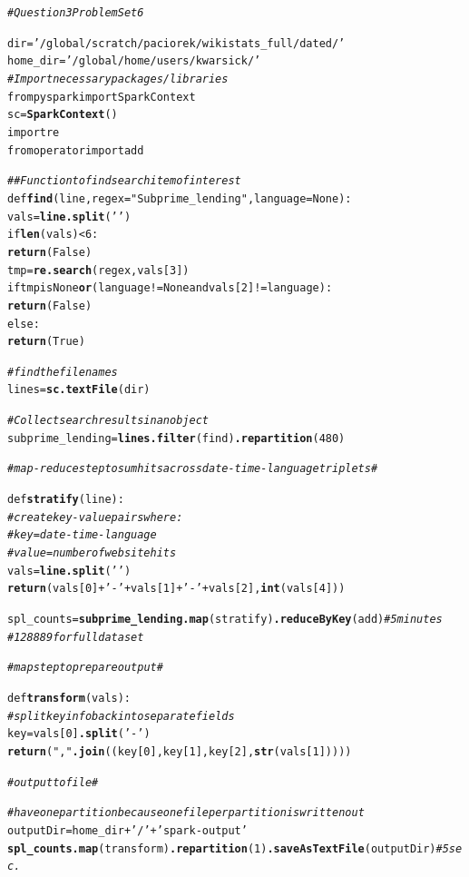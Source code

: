 \documentclass{article}\usepackage[]{graphicx}\usepackage[]{color}
\makeatletter
\newcommand{\hlstr}[1]{\textcolor[rgb]{0.192,0.494,0.8}{#1}}%
\newcommand{\hlcom}[1]{\textcolor[rgb]{0.678,0.584,0.686}{\textit{#1}}}%
\newcommand{\hlkwd}[1]{\textcolor[rgb]{0.737,0.353,0.396}{\textbf{#1}}}%
\newenvironment{kframe}{%
 \def\at@end@of@kframe{}%
 \ifinner\ifhmode%
  \def\at@end@of@kframe{\end{minipage}}%
  \begin{minipage}{\columnwidth}%
 \fi\fi%
 \def\FrameCommand##1{\hskip\@totalleftmargin \hskip-\fboxsep
 \colorbox{shadecolor}{##1}\hskip-\fboxsep
     \hskip-\linewidth \hskip-\@totalleftmargin \hskip\columnwidth}%
 \MakeFramed {\advance\hsize-\width
   \@totalleftmargin\z@ \linewidth\hsize
   \@setminipage}}%
 {\par\unskip\endMakeFramed%
 \at@end@of@kframe}
\newenvironment{knitrout}{}{} %
\makeatother
\begin{document}
\begin{knitrout}
\color{fgcolor}\begin{kframe}
\begin{alltt}
\hlcom{#Question 3 Problem Set 6}

dir      = \hlstr{'/global/scratch/paciorek/wikistats_full/dated/'}
home_dir = \hlstr{'/global/home/users/kwarsick/'}
\hlcom{#Import necessary packages/libraries}
from pyspark import SparkContext
sc = \hlkwd{SparkContext}()
import re
from operator import add

\hlcom{##Function to find search item of interest}
def \hlkwd{find}(line, regex = \hlstr{"Subprime_lending"}, language = None):
    vals = \hlkwd{line.split}(\hlstr{' '})
    if \hlkwd{len}(vals) < 6:
        \hlkwd{return}(False)
    tmp = \hlkwd{re.search}(regex, vals[3])
    if tmp is None \hlkwd{or} (language != None and vals[2] != language):
        \hlkwd{return}(False)
    else:
        \hlkwd{return}(True)

\hlcom{# find the file names}
lines = \hlkwd{sc.textFile}(dir) 		


\hlcom{#Collect search results in an object}
subprime_lending = \hlkwd{lines.filter}(find)\hlkwd{.repartition}(480)

\hlcom{# map-reduce step to sum hits across date-time-language triplets #}
    
def \hlkwd{stratify}(line):
\hlcom{    # create key-value pairs where:}
\hlcom{    #   key = date-time-language}
\hlcom{    #   value = number of website hits}
    vals = \hlkwd{line.split}(\hlstr{' '})
    \hlkwd{return}(vals[0] + \hlstr{'-'} + vals[1] + \hlstr{'-'} + vals[2], \hlkwd{int}(vals[4]))
	
	
spl_counts = \hlkwd{subprime_lending.map}(stratify)\hlkwd{.reduceByKey}(add)  \hlcom{# 5 minutes}
\hlcom{# 128889 for full dataset}

\hlcom{# map step to prepare output #}

def \hlkwd{transform}(vals):
\hlcom{    # split key info back into separate fields}
    key = vals[0]\hlkwd{.split}(\hlstr{'-'})
    \hlkwd{return}(\hlstr{","}\hlkwd{.join}((key[0], key[1], key[2], \hlkwd{str}(vals[1]))))

\hlcom{# output to file #}

\hlcom{# have one partition because one file per partition is written out}
outputDir = home_dir + \hlstr{'/'} + \hlstr{'spark-output'}
\hlkwd{spl_counts.map}(transform)\hlkwd{.repartition}(1)\hlkwd{.saveAsTextFile}(outputDir) \hlcom{# 5 sec.}
\end{alltt}
\end{kframe}
\end{knitrout}
\end{document}
